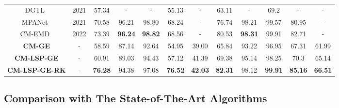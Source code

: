 \documentclass[journal]{IEEEtran}
\begin{document}
\begin{table*}[]
\begin{tabular}{c|c|ccccc|ccccc}
		DGTL~\cite{liu2021strong}                     & 2021                  & 57.34                       & -                            & -                            & 55.13                    & -              & 63.11                       & -                            & 69.2                         & -                        & -              \\
		MPANet~\cite{wu2021discover}                    & 2021                  & 70.58                       & 96.21                        & 98.80                        & 68.24                    & -              & 76.74                       & 98.21                        & 99.57                        & 80.95                    & -              \\ \hline
		CM-EMD~\cite{ling2022cross}                   & 2022                  & 73.39                       & \textbf{96.24}               & \textbf{98.82}               & 68.56                    & -              & 80.53                       & \textbf{98.31}               & 99.91                        & 82.71                    & -              \\ \hline
		\textbf{CM-GE}                    & -                     & 58.59                       & 87.14                        & 92.64                        & 54.95                    & 39.00          & 65.84                       & 93.22                        & 96.95                        & 67.31                    & 61.99          \\
		\textbf{CM-LSP-GE}                   & -                     & 60.91                       & 89.03                        & 94.43                        & 57.12                    & 41.39          & 69.38                       & 95.14                        & 98.25                        & 70.3                     & 65.14          \\
		\textbf{CM-LSP-GE-RK}             & -                     & \textbf{76.28}              & 94.38                        & 97.08                        & \textbf{76.52}           & \textbf{42.03} & \textbf{82.31}              & 98.12                        & \textbf{99.91}               & \textbf{85.16}           & \textbf{66.51} \\ \hline
	\end{tabular}
\end{table*}


\subsection{Comparison with The State-of-The-Art Algorithms}
\end{document}
